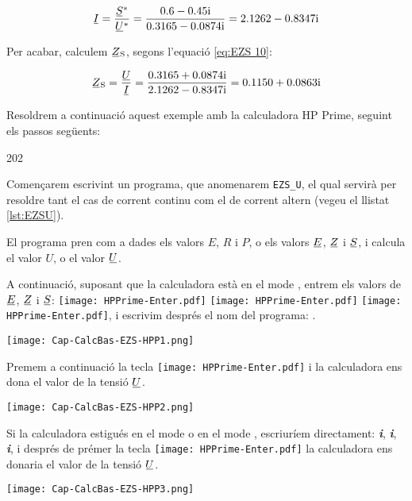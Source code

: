 \begin{exemple}
    \[
       \cmplx{I} = \frac{\cmplx{S}^*}{\cmplx{U}^*} = \frac{\complexnum{0,6-j 0,45}}{\complexnum{0,3165 - j 0,0874}}
       = \complexnum{2,1262 - j 0,8347}
    \]

    Per acabar, calculem $\cmplx{Z}\ped{S}$, segons l'equació
    \eqref{eq:EZS 10}:

    \[
        \cmplx{Z}\ped{S} = \frac{\cmplx{U}}{\cmplx{I}} = \frac{\complexnum{0,3165 + j 0,0874}}
        {\complexnum{2,1262 - j 0,8347}} = \complexnum{0,1150 + j 0,0863}
    \]

    Resoldrem a continuació aquest exemple amb la calculadora \textsf{HP Prime}, seguint els passos següents:
    \begin{dingautolist}{202}
        \item Començarem escrivint un programa, que anomenarem  \texttt{EZS\_U}, el qual servirà per resoldre tant el cas de corrent continu com el de corrent altern (vegeu el llistat \vref{lst:EZSU}).

        El programa pren com a dades els valors  $E$, $R$ i $P$, o els valors  $\cmplx{E}$, $\cmplx{Z}$ i $\cmplx{S}$, i calcula el valor  $U$, o el valor $\cmplx{U}$.


    \item A continuació, suposant  que la calculadora està en el mode , entrem els valors de $\cmplx{E}$, $\cmplx{Z}$ i $\cmplx{S}$:  \texttt{[image: HPPrime-Enter.pdf]}  \texttt{[image: HPPrime-Enter.pdf]}  \texttt{[image: HPPrime-Enter.pdf]}, i  escrivim després el nom del programa: .

        \texttt{[image: Cap-CalcBas-EZS-HPP1.png]}

    \item Premem a continuació la tecla \texttt{[image: HPPrime-Enter.pdf]} i la calculadora ens dona el valor de la tensió $\cmplx{U}$.

        \texttt{[image: Cap-CalcBas-EZS-HPP2.png]}


     \item   Si la calculadora estigués en el mode  o en el mode  , escriuríem directament: \textit{\textbf{i}}, \textit{\textbf{i}}, \textit{\textbf{i}}\textsfs{)}, i després de prémer la tecla \texttt{[image: HPPrime-Enter.pdf]} la calculadora ens donaria el valor de la tensió $\cmplx{U}$.

        \texttt{[image: Cap-CalcBas-EZS-HPP3.png]}

    \end{dingautolist}
\end{exemple}



